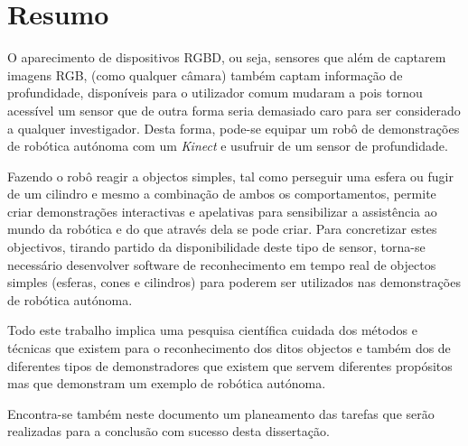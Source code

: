\chapter{Resumo}

O aparecimento de dispositivos RGBD, ou seja, sensores que além de captarem imagens RGB,
(como qualquer câmara) também captam informação de profundidade, disponíveis para o utilizador
comum mudaram a pois tornou acessível um sensor que de outra forma seria demasiado caro
para ser considerado a qualquer investigador. Desta forma, pode-se equipar um robô de demonstrações de
robótica autónoma com um \emph{Kinect} e usufruir de um sensor de profundidade.

Fazendo o robô reagir a objectos simples, tal como perseguir uma esfera ou
fugir de um cilindro e mesmo a combinação de ambos os comportamentos, permite 
criar demonstrações interactivas e apelativas para sensibilizar a assistência 
ao mundo da robótica e do que através dela se pode criar. Para concretizar estes objectivos,
tirando partido da disponibilidade deste tipo de sensor, torna-se necessário desenvolver 
software de reconhecimento em tempo real de objectos simples (esferas, cones
e cilindros) para poderem ser utilizados nas demonstrações de robótica
autónoma. 

Todo este trabalho implica uma pesquisa científica cuidada dos métodos e técnicas
que existem para o reconhecimento dos ditos objectos e também dos de diferentes tipos
de demonstradores que existem que servem diferentes propósitos mas que demonstram
um exemplo de robótica autónoma.

Encontra-se também neste documento um planeamento das tarefas que serão realizadas
para a conclusão com sucesso desta dissertação.

